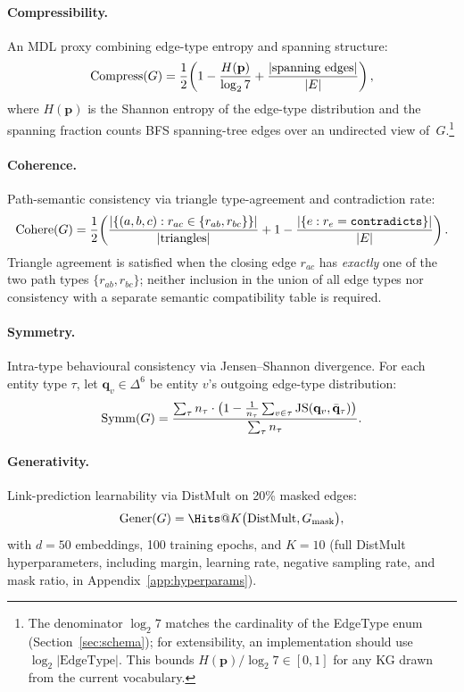 \paragraph{Compressibility.}
An MDL proxy combining edge-type entropy and spanning structure:
\begin{equation}\label{eq:compress}
  \operatorname{Compress}(G) = \frac{1}{2}\!\left(
    1 - \frac{H(\mathbf{p})}{\log_2 7}
    + \frac{|\text{spanning edges}|}{|E|}
  \right),
\end{equation}
where $H(\mathbf{p})$ is the Shannon entropy of the edge-type distribution
and the spanning fraction counts BFS spanning-tree edges over an undirected
view of~$G$.\footnote{The denominator $\log_2 7$ matches the cardinality of
the EdgeType enum (Section~\ref{sec:schema}); for extensibility, an
implementation should use $\log_2|\text{EdgeType}|$.  This bounds
$H(\mathbf{p})/\log_2 7 \in [0,1]$ for any KG drawn from the current
vocabulary.}

\paragraph{Coherence.}
Path-semantic consistency via triangle type-agreement and contradiction rate:
\begin{equation}\label{eq:cohere}
  \operatorname{Cohere}(G) = \frac{1}{2}\!\left(
    \frac{|\{(a,b,c) : r_{ac} \in \{r_{ab}, r_{bc}\}\}|}{|\text{triangles}|}
    + 1 - \frac{|\{e : r_e = \texttt{contradicts}\}|}{|E|}
  \right).
\end{equation}
Triangle agreement is satisfied when the closing edge $r_{ac}$ has
\emph{exactly} one of the two path types $\{r_{ab}, r_{bc}\}$;
neither inclusion in the union of all edge types nor consistency
with a separate semantic compatibility table is required.

\paragraph{Symmetry.}
Intra-type behavioural consistency via Jensen--Shannon divergence.  For each
entity type $\tau$, let $\mathbf{q}_v \in \Delta^6$ be entity $v$'s outgoing
edge-type distribution:
\begin{equation}\label{eq:symm}
  \operatorname{Symm}(G) = \frac{\sum_\tau n_\tau \cdot \bigl(1 - \frac{1}{n_\tau}
    \sum_{v \in \tau} \text{JS}(\mathbf{q}_v, \bar{\mathbf{q}}_\tau)\bigr)}
    {\sum_\tau n_\tau}.
\end{equation}

\paragraph{Generativity.}
Link-prediction learnability via DistMult \citep{yang2015distmult} on 20\%
masked edges:
\begin{equation}\label{eq:gener}
  \Gener(G) = \Hits@K\bigl(\text{DistMult}, G_{\text{mask}}\bigr),
\end{equation}
with $d{=}50$ embeddings, 100 training epochs, and $K{=}10$
(full DistMult hyperparameters, including margin, learning rate,
negative sampling rate, and mask ratio, in
Appendix~\ref{app:hyperparams}).

